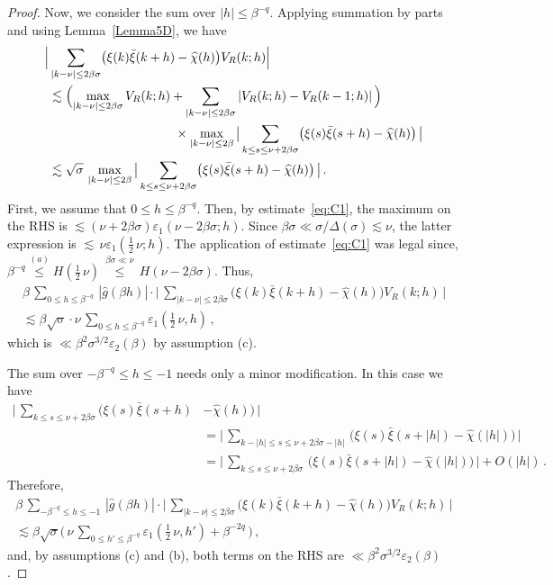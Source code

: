 \documentclass[10pt,a4paper]{amsart}
\def\ep{{\varepsilon}}
\begin{document}
\begin{proof}
Now, we consider the sum over $|h|\le\beta^{-q}$.
Applying summation by parts and using Lemma~\ref{Lemma5D}, we have
\begin{align*}
\Bigl| &\sum_{|k-\nu|\le 2\beta\sigma}
\bigl( \xi(k)\bar\xi(k+h) - \widehat{\chi}(h) \bigr) V_R(k; h) \Bigr|
\\
&\lesssim
\Bigl(\max_{|k-\nu|\le 2\beta\sigma} V_R(k; h)+ \sum_{|k-\nu|\le 2\beta\sigma} |V_R(k; h)-V_R(k-1; h)|\,\Bigr) 
\\&\qquad\qquad\qquad\qquad\qquad\times
\max_{|k-\nu|\le 2\beta}\, \bigl|\,
\sum_{k\le s \le \nu +2\beta\sigma}
\bigl(  \xi(s)\bar\xi(s+h) - \widehat{\chi}(h) \bigr)\,
\bigr|
\\
&\lesssim
\sqrt{\sigma}\, \max_{|k-\nu|\le 2\beta}\, \bigl|\,
\sum_{k\le s \le \nu +2\beta\sigma}
\bigl(  \xi(s)\bar\xi(s+h) - \widehat{\chi}(h) \bigr)
\,\bigr|\,.
\end{align*}
First, we assume that $0\le h \le \beta^{-q}$. Then, by estimate~\eqref{eq:C1},
the maximum on the RHS is $ \lesssim (\nu + 2\beta\sigma)\ep_1(\nu-2\beta\sigma; h)$.
Since $\beta\sigma \ll \sigma/\Delta(\sigma) \lesssim \nu$, the latter expression is
$ \lesssim \, \nu\ep_1(\tfrac12\, \nu; h) $. The application of estimate~\eqref{eq:C1} was legal since,
$  \beta^{-q} \stackrel{(a)}\le H(\tfrac12\, \nu) \,
\stackrel{\beta\sigma\ll\nu}\le\, H(\nu-2\beta\sigma) $.
Thus,
\begin{multline*}
\beta\, \sum_{0\le h \le \beta^{-q}}\,
|\widehat{g}(\beta h)| \cdot
\bigl|\, \sum_{|k-\nu|\le 2\beta\sigma}
\bigl( \xi(k)\bar\xi(k+h) - \widehat{\chi}(h) \bigr) V_R(k; h) \,\bigr|
\\
\lesssim
\beta\sqrt{\sigma}\cdot \nu\, \sum_{0\le h \le \beta^{-q}} \ep_1(\tfrac12\, \nu, h)\,,
\end{multline*}
which is $\ll \beta^2\sigma^{3/2} \ep_2(\beta)$ by assumption (c).

The sum over $-\beta^{-q} \le h \le -1$ needs only a minor modification.
In this case we have
\begin{align*}
\bigl|\, \sum_{k\le s \le \nu +2\beta\sigma}
\bigl(  \xi(s)\bar\xi(s+h) &- \widehat{\chi}(h) \bigr) \,\bigr|\\
&= \bigl|\, \sum_{k-|h|\le s \le \nu +2\beta\sigma-|h|}\,
\bigl(  \xi(s)\bar\xi(s+|h|) - \widehat{\chi}(|h|) \bigr) \,\bigr| \\
&= \bigl|\, \sum_{k\le s \le \nu +2\beta\sigma}\,
\bigl(  \xi(s)\bar\xi(s+|h|) - \widehat{\chi}(|h|) \bigr) \,\bigr| + O(|h|)\,.
\end{align*}
Therefore,
\begin{multline*}
\beta\, \sum_{-\beta^{-q}\le h \le -1}\,
|\widehat{g}(\beta h)| \cdot
\bigl|\, \sum_{|k-\nu|\le 2\beta\sigma}
\bigl( \xi(k)\bar\xi(k+h) - \widehat{\chi}(h) \bigr) V_R(k; h) \,\bigr|
\\
\lesssim
\beta\sqrt{\sigma}\bigl(\, \nu\, \sum_{0\le h' \le \beta^{-q}} \ep_1(\tfrac12\, \nu, h')
+ \beta^{-2q}\,\bigr)\,,
\end{multline*}
and, by assumptions (c) and (b), both terms on the RHS are $\ll \beta^2\sigma^{3/2} \ep_2(\beta)$.


\end{proof}
\end{document}
